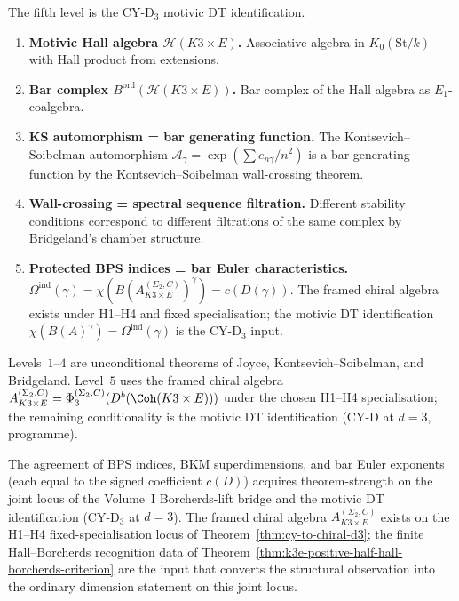 \begin{conjecture}
\label{conj:k3e-five-level-bridge}
The fifth level is the CY-D$_3$ motivic DT identification.
\begin{enumerate}[label=\textup{Level \arabic*.}, leftmargin=*]
 \item \textbf{Motivic Hall algebra $\mathcal{H}(K3 \times E)$.} Associative algebra in $K_0(\mathrm{St}/k)$ with Hall product from extensions.
 \item \textbf{Bar complex $B^{\mathrm{ord}}(\mathcal{H}(K3 \times E))$.} Bar complex of the Hall algebra as $E_1$-coalgebra.
 \item \textbf{KS automorphism = bar generating function.} The Kontsevich--Soibelman automorphism $\mathcal{A}_\gamma = \exp(\sum e_{n\gamma}/n^2)$ is a bar generating function by the Kontsevich--Soibelman wall-crossing theorem.
 \item \textbf{Wall-crossing = spectral sequence filtration.} Different stability conditions correspond to different filtrations of the same complex by Bridgeland's chamber structure.
 \item \textbf{Protected BPS indices = bar Euler characteristics.} $\Omega^{\mathrm{ind}}(\gamma) = \chi(B(A_{K3 \times E}^{(\Sigma_2,C)})^\gamma) = c(D(\gamma))$. The framed chiral algebra exists under H1--H4 and fixed specialisation; the motivic DT identification $\chi(B(A)^\gamma) = \Omega^{\mathrm{ind}}(\gamma)$ is the CY-D$_3$ input.
\end{enumerate}
Levels~$1$--$4$ are unconditional theorems of Joyce, Kontsevich--Soibelman, and Bridgeland. Level~$5$ uses the framed chiral algebra $A_{K3 \times E}^{(\Sigma_2,C)} = \Phi_3^{(\Sigma_2,C)}(D^b(\Coh(K3 \times E)))$ under the chosen H1--H4 specialisation; the remaining conditionality is the motivic DT identification (CY-D at $d = 3$, programme).
\end{conjecture}

\begin{remark}
\label{rem:k3e-bridge-observation}
The agreement of BPS indices, BKM superdimensions, and bar Euler exponents (each equal to the signed coefficient $c(D)$) acquires theorem-strength on the joint locus of the Volume~I Borcherds-lift bridge and the motivic DT identification (CY-D$_3$ at $d = 3$). The framed chiral algebra $A_{K3 \times E}^{(\Sigma_2,C)}$ exists on the H1--H4 fixed-specialisation locus of Theorem~\ref{thm:cy-to-chiral-d3}; the finite Hall--Borcherds recognition data of Theorem~\ref{thm:k3e-positive-half-hall-borcherds-criterion} are the input that converts the structural observation into the ordinary dimension statement on this joint locus.
\end{remark}

